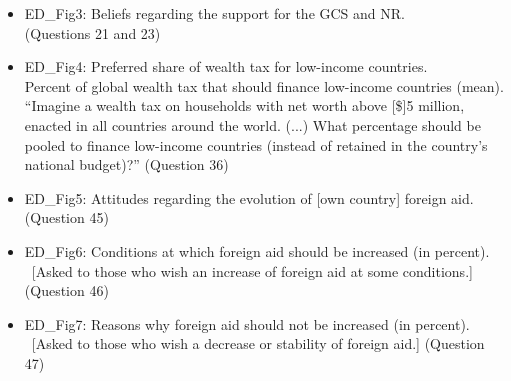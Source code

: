 \documentclass[12pt,english]{article}
\begin{document}
\begin{itemize}
  \item ED\_Fig3: Beliefs regarding the support for the GCS and NR.\\ (Questions 21 and 23)
  \item ED\_Fig4: Preferred share of wealth tax for low-income countries.\\ Percent of global wealth tax that should finance low-income countries (mean).\\
  ``Imagine a wealth tax on households with net worth above [\$]5 million, enacted in all   countries around the world. (...)   What percentage should be pooled to finance low-income countries (instead of retained  in the country's national budget)?'' (Question 36)
  \item ED\_Fig5: Attitudes regarding the evolution of [own country] foreign aid.\\ (Question 45)
  \item ED\_Fig6: Conditions at which foreign aid should be increased (in percent).\\ ~[Asked to those who wish an increase of foreign aid at some conditions.] (Question 46)
  \item ED\_Fig7: Reasons why foreign aid should not be increased (in percent).\\ ~[Asked to those who wish a decrease or stability of foreign aid.] (Question 47)
\end{itemize}
\end{document}
